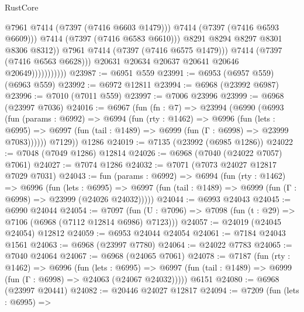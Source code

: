 \begin{lexlean}{RustCore}
\begin{coremodule}
                                        @7961
                                        @7414
                                        (@7397 (@7416 @6603 @1479)))
                                      @7414
                                      (@7397 (@7416 @6593 @6609)))
                                    @7414
                                    (@7397 (@7416 @6583 @6610)))
                                  @8291
                                  @8294
                                  @8297
                                  @8301
                                  @8306
                                  @8312))
                              @7961
                              @7414
                              (@7397 (@7416 @6575 @1479)))
                            @7414
                            (@7397 (@7416 @6563 @6628)))
                          @20631
                          @20634
                          @20637
                          @20641
                          @20646
                          @20649)))))))))))
@23987 := @6951 @559
@23991 := @6953 (@6957 @559) (@6963 @559)
@23992 := @6972 @12811
@23994 := @6968 (@23992 @6987)
@23996 := @7010 (@7011 @559)
@23997 := @7006 @23996
@23999 := @6968 (@23997 @7036)
@24016 := @6967
    (fun (fn : @7) =>
    @23994
      (@6990
        (@6993
          (fun (params : @6992) =>
          @6994
            (fun (rty : @1462) =>
            @6996
              (fun (lets : @6995) =>
              @6997 (fun (tail : @1489) => @6999 (fun (Γ : @6998) => @23999 @7083))))))
        @7129))
    @1286
@24019 := @7135 (@23992 (@6985 @1286))
@24022 := @7048 (@7049 @1286) @12814
@24026 := @6968 (@7040 (@24022 @7057) @7061)
@24027 := @7074 @1286
@24032 := @7071 (@7073 @24027 @12817 @7029 @7031)
@24043 := fun (params : @6992) =>
  @6994
    (fun (rty : @1462) =>
    @6996
      (fun (lets : @6995) =>
      @6997 (fun (tail : @1489) => @6999 (fun (Γ : @6998) => @23999 (@24026 @24032)))))
@24044 := @6993 @24043
@24045 := @6990 @24044
@24054 := @7097
    (fun (U : @7096) => @7098 (fun (t : @29) => @7106 (@6968 (@7112 @12814 @6986) @7123)))
@24057 := @24019 (@24045 @24054) @12812
@24059 := @6953 @24044 @24054
@24061 := @7184 @24043 @1561
@24063 := @6968 (@23997 @7780)
@24064 := @24022 @7783
@24065 := @7040 @24064
@24067 := @6968 (@24065 @7061)
@24078 := @7187
    (fun (rty : @1462) =>
    @6996
      (fun (lets : @6995) =>
      @6997 (fun (tail : @1489) => @6999 (fun (Γ : @6998) => @24063 (@24067 @24032)))))
    @6151
@24080 := @6968 (@23997 @20441)
@24082 := @20446 @24027 @12817
@24094 := @7209
    (fun (lets : @6995) =>

\end{coremodule}
\end{lexlean}
